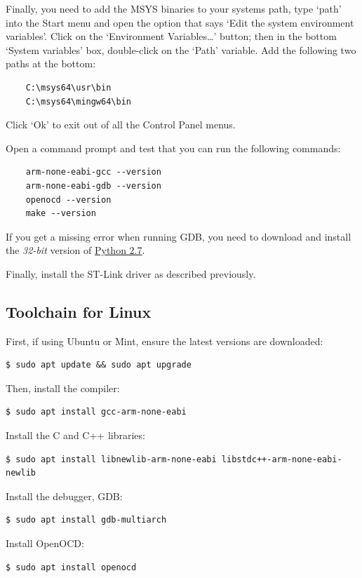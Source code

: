 Finally, you need to add the MSYS binaries to your systems path, type `path'
into the Start menu and open the option that says `Edit the system environment
variables'. Click on the `Environment Variables\ldots' button; then in the
bottom `System variables' box, double-click on the `Path' variable. Add the
following two paths at the bottom:
\begin{verbatim}
    C:\msys64\usr\bin
    C:\msys64\mingw64\bin
\end{verbatim}
Click `Ok' to exit out of all the Control Panel menus.

Open a command prompt and test that you can run the following commands:
\begin{verbatim}
    arm-none-eabi-gcc --version
    arm-none-eabi-gdb --version
    openocd --version
    make --version
\end{verbatim}
If you get a missing  error when running GDB, you need to
download and install the \emph{32-bit} version of
\href{https://www.python.org/downloads/release/python-2718/}{Python 2.7}.

Finally, install the ST-Link driver as described previously.

\subsection{Toolchain for Linux}

First, if using Ubuntu or Mint, ensure the latest versions are
downloaded:
%
\begin{verbatim}
$ sudo apt update && sudo apt upgrade
\end{verbatim}

Then, install the compiler:
%
\begin{verbatim}
$ sudo apt install gcc-arm-none-eabi
\end{verbatim}

Install the C and C++ libraries:
%
\begin{verbatim}
$ sudo apt install libnewlib-arm-none-eabi libstdc++-arm-none-eabi-newlib
\end{verbatim}

Install the debugger, GDB:
%
\begin{verbatim}
$ sudo apt install gdb-multiarch
\end{verbatim}

Install OpenOCD:
%
\begin{verbatim}
$ sudo apt install openocd
\end{verbatim}

